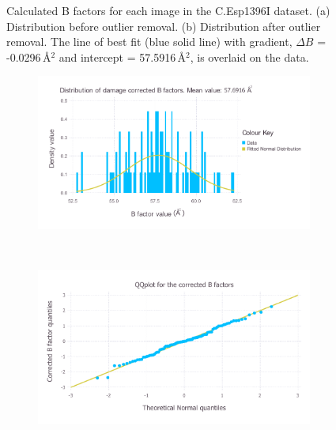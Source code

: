 \begin{figure}
\begin{subfigure}[b]{1.0\textwidth}
            \caption{}
            \label{fig:B factors per image after outlier removal - C.Esp1396I}
    \end{subfigure}
    \caption[Calculated B factors for each image in the C.Esp1396I dataset.]{Calculated B factors for each image in the C.Esp1396I dataset.
    (a) Distribution before outlier removal.
    (b) Distribution after outlier removal.
    The line of best fit (blue solid line) with gradient, $\Delta B$ = -0.0296$\,$\AA$^2$ and intercept = 57.5916$\,$\AA$^2$, is overlaid on the data.}
    \label{fig:B factors per image - C.Esp1396I}
\end{figure}

\begin{figure}
    \centering
    \begin{subfigure}[b]{1.0\textwidth}
            \centering
            \includegraphics[width=\textwidth]{figures/datared/BFac_Distribution_cprot.pdf}
            \caption{}
            \label{fig:Damage corrected B factor distribution - C.Esp1396I}
    \end{subfigure}
    \\
    \begin{subfigure}[b]{1.0\textwidth}
            \centering
            \includegraphics[width=\textwidth]{figures/datared/BFac_QQplot_cprot.pdf}

\end{subfigure}
\end{figure}

